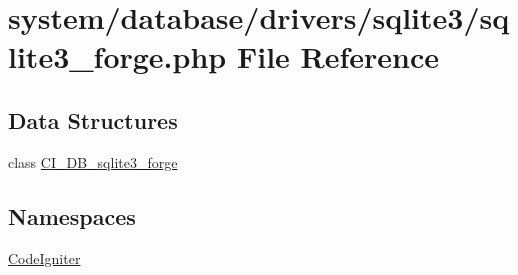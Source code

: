 \hypertarget{sqlite3__forge_8php}{}\section{system/database/drivers/sqlite3/sqlite3\+\_\+forge.php File Reference}
\label{sqlite3__forge_8php}
\subsection*{Data Structures}
\begin{DoxyCompactItemize}
\item 
class \mbox{\hyperlink{class_c_i___d_b__sqlite3__forge}{C\+I\+\_\+\+D\+B\+\_\+sqlite3\+\_\+forge}}
\end{DoxyCompactItemize}
\subsection*{Namespaces}
\begin{DoxyCompactItemize}
\item 
 \mbox{\hyperlink{namespace_code_igniter}{Code\+Igniter}}
\end{DoxyCompactItemize}
